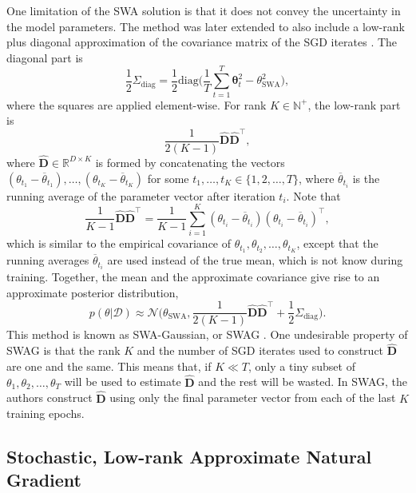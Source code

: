 \documentclass[msc,deptreport.inf]{infthesis} %
\newcommand{\matr}[1]{\mathbf{#1}}
\newcommand{\bgreek}[1]{\boldsymbol{#1}}
\newcommand{\R}{\mathbb R}
\newcommand{\N}{\mathbb N}
\begin{document}
One limitation of the SWA solution is that it does not convey the uncertainty in the model parameters. The method was later extended to also include a low-rank plus diagonal approximation of the covariance matrix of the SGD iterates \cite{maddox2019}. The diagonal part is
\begin{equation}
	\frac{1}{2}\Sigma_\text{diag} = \frac{1}{2} \text{diag}\Bigg(\frac{1}{T}\sum_{t=1}^T \bgreek{\theta}_t^2 - \theta_{\text{SWA}}^2 \Bigg),
\end{equation}
where the squares are applied element-wise. For rank $K \in \N^+$, the low-rank part is
\begin{equation}
	\frac{1}{2(K-1)} \hat{\matr{D}}\hat{\matr{D}}^\intercal,
\end{equation}
where $\hat{\matr{D}} \in \R^{D \times K}$ is formed by concatenating the vectors $(\theta_{t_1} - \overline{\theta}_{t_1}), \dots, (\theta_{t_K} - \overline{\theta}_{t_K})$ for some $t_1, \dots, t_K \in \{1,2, \dots, T\}$, where $\overline{\theta}_{t_i}$ is the running average of the parameter vector after iteration $t_i$. Note that 
\begin{equation}
	\frac{1}{K-1} \hat{\matr{D}}\hat{\matr{D}}^\intercal
	= \frac{1}{K-1} \sum_{i=1}^K (\theta_{t_i} - \overline{\theta}_{t_i}) (\theta_{t_i} - \overline{\theta}_{t_i})^\intercal,
\end{equation}
which is similar to the empirical covariance of $\theta_{t_1}, \theta_{t_2}, \dots, \theta_{t_K}$, except that the running averages $\overline{\theta}_{t_i}$ are used instead of the true mean, which is not know during training. Together, the mean and the approximate covariance give rise to an approximate posterior distribution, 
\begin{equation}\label{eqn:swag_dist}
	p(\theta | \mathcal{D}) \approx 
	\mathcal{N}\Big(\theta_\text{SWA}, \frac{1}{2(K-1)} \hat{\matr{D}}\hat{\matr{D}}^\intercal + \frac{1}{2}\Sigma_\text{diag}\Big).
\end{equation}
This method is known as SWA-Gaussian, or SWAG \cite{maddox2019}. One undesirable property of SWAG is that the rank $K$ and the number of SGD iterates used to construct $\hat{\matr{D}}$ are one and the same. This means that, if $K \ll T$, only a tiny subset of $\theta_1, \theta_2, \dots, \theta_T$ will be used to estimate $\hat{\matr{D}}$ and the rest will be wasted. In SWAG, the authors construct $\hat{\matr{D}}$ using only the final parameter vector from each of the last $K$ training epochs. 


\subsection{Stochastic, Low-rank Approximate Natural Gradient}\label{sec:slang}
\end{document}
